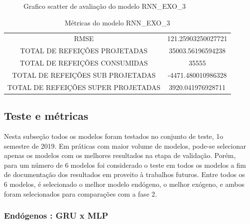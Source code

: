 {\begin{center}
\begin{minipage}[b]{0.45\textwidth}
\begin{figure}[H]
{                  }
                  \caption{Grafico scatter de avaliação do modelo RNN\_EXO\_3 \label{fig:case1_rnn_exo_3_val_scatter} }
                \end{figure} \end{minipage}
                \end{center} }
                
                
                
                
                
                 \begin{table}[!ht]
                \centering
                \caption{Métricas do modelo  RNN\_EXO\_3 }
                 \begin{tabular}{|c|c|}
                     \rowcolor{gray!50}
                     \hline
                     \multicolumn{2}{c}{ METRICAS DO MODELO RNN\_EXO\_3 : } \\ \hline
                        RMSE & 121.25903250027721\\
                        TOTAL DE REFEIÇÕES PROJETADAS & 35003.56196594238\\
                        TOTAL DE REFEIÇÕES CONSUMIDAS &  35555\\
                        TOTAL DE REFEIÇÕES SUB PROJETADAS & -4471.480010986328\\
                        TOTAL DE REFEIÇÕES SUPER PROJETADAS & 3920.041976928711 \\ \hline 
                \end{tabular} \end{table}
        
    	\subsection{Teste e métricas}
    	    Nesta subseção todos os modelos foram testados no conjunto de teste, 1o semestre de 2019. Em práticas com maior volume de modelos, pode-se selecionar apenas os modelos com os melhores resultados na etapa de validação. Porém, para um número de 6 modelos foi considerado o teste em todos os modelos a fim de documentação dos resultados em proveito à trabalhos futuros. 
    	    Entre todos os 6 modelos, é selecionado o melhor modelo endógeno, o melhor exógeno, e ambos foram selecionados para comparações com a fase 2.
    	    
    	    \subsubsection{Endógenos : GRU x MLP}
    	    
